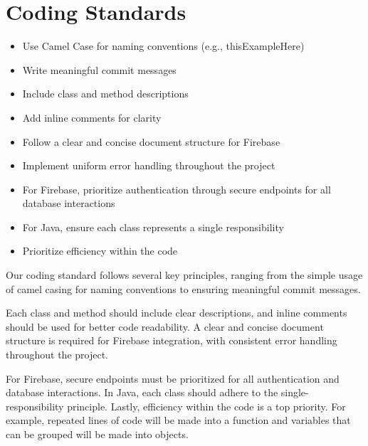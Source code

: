 \section{Coding Standards}
\begin{itemize}
    \item Use Camel Case for naming conventions (e.g., thisExampleHere)
    \item Write meaningful commit messages
    \item Include class and method descriptions
    \item Add inline comments for clarity
    \item Follow a clear and concise document structure for Firebase 
    \item Implement uniform error handling throughout the project
    \item For Firebase, prioritize authentication through secure endpoints for all database interactions
    \item For Java, ensure each class represents a single responsibility
    \item Prioritize efficiency within the code
\end{itemize}

Our coding standard follows several key principles, ranging from the simple usage of camel casing for naming conventions to ensuring meaningful commit messages. 

Each class and method should include clear descriptions, and inline comments should be used for better code readability. A clear and concise document structure is required for Firebase integration, with consistent error handling throughout the project.

For Firebase, secure endpoints must be prioritized for all authentication and database interactions. In Java, each class should adhere to the single-responsibility principle. Lastly, efficiency within the code is a top priority. For example, repeated lines of code will be made into a function and variables that can be grouped will be made into objects.